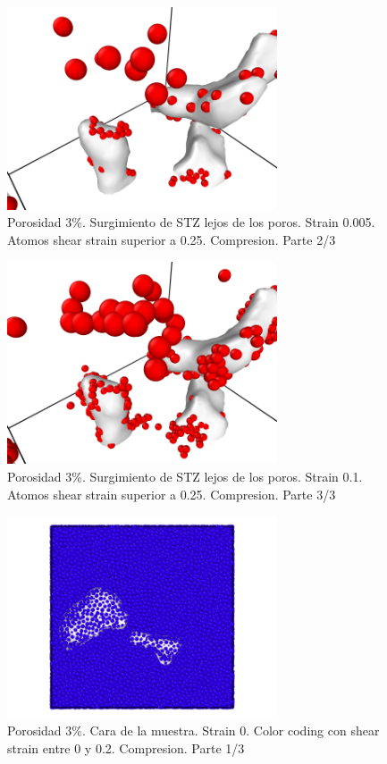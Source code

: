 \documentclass[10pt, oneside]{article} %
\begin{document}
\begin{figure}[H]
\centering
\includegraphics[width=8cm]{Figures/Porosidad/porosidad_STZObservation_3_0005.png}
\caption{Porosidad 3\%. Surgimiento de STZ lejos de los poros. Strain 0.005. Atomos shear strain superior a 0.25. Compresion. Parte 2/3}
\end{figure}

\begin{figure}[H]
\centering
\includegraphics[width=8cm]{Figures/Porosidad/porosidad_STZObservation_3_01.png}
\caption{Porosidad 3\%. Surgimiento de STZ lejos de los poros. Strain 0.1. Atomos shear strain superior a 0.25. Compresion. Parte 3/3}
\end{figure}

\begin{figure}[H]
\centering
\includegraphics[width=8cm]{Figures/Porosidad/porosidad_3_faceAS_0_02.png}
\caption{Porosidad 3\%. Cara de la muestra. Strain 0. Color coding con shear strain entre 0 y 0.2. Compresion. Parte 1/3}
\end{figure}
\end{document}
